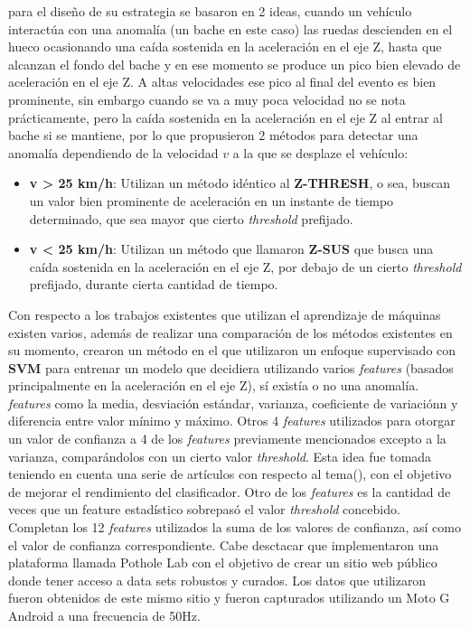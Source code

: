 \cite{mohan2008nericell} para el diseño de su estrategia se basaron en 2 ideas, cuando un vehículo interactúa con una
anomalía (un bache en este caso) las ruedas descienden en el hueco ocasionando una caída sostenida en la aceleración en el eje Z,
hasta que alcanzan el fondo del bache y en ese momento se produce un pico bien elevado de aceleración en el eje Z. A altas velocidades
ese pico al final del evento es bien prominente, sin embargo cuando se va a muy poca velocidad no se nota prácticamente, pero la caída
sostenida en la aceleración en el eje Z al entrar al bache si se mantiene, por lo que propusieron 2 métodos para detectar una anomalía
dependiendo de la velocidad $v$ a la que se desplaze el vehículo:\\

\begin{itemize}
	\item \textbf {v > 25 km/h}:  Utilizan un método idéntico al \textbf {Z-THRESH}, o sea, buscan un valor bien prominente de
	      aceleración en un instante de tiempo determinado, que sea mayor que cierto \emph{threshold} prefijado.\\
	\item \textbf {v < 25 km/h}:  Utilizan un método que llamaron \textbf {Z-SUS} que busca una caída sostenida en la aceleración
	      en el eje Z, por debajo de un cierto \emph{threshold} prefijado, durante cierta cantidad de tiempo.\\
\end{itemize}

Con respecto a los trabajos existentes que utilizan el aprendizaje de máquinas existen varios, \cite{carlos2018evaluation} además de realizar
una comparación de los métodos existentes en su momento, crearon un método en el que utilizaron un enfoque supervisado con \textbf{SVM} para entrenar
un modelo que decidiera utilizando varios \emph{features} (basados principalmente en la aceleración en el eje Z), sí existía o no una anomalía. \emph{features}
como la media, desviación estándar, varianza, coeficiente de variaciónn y diferencia entre valor mínimo y máximo. Otros 4 \emph{features} utilizados para
otorgar un valor de confianza a 4 de los \emph{features} previamente mencionados excepto a la varianza, comparándolos con un cierto valor \emph{threshold}.
Esta idea fue tomada teniendo en cuenta una serie de artículos con respecto al tema(\cite{mednis2011real}), con el objetivo de mejorar el rendimiento
del clasificador. Otro de los \emph{features} es la cantidad de veces que un feature estadístico sobrepasó el valor \emph{threshold} concebido. Completan los
12 \emph{features} utilizados la suma de los valores de confianza, así como el valor de confianza correspondiente. Cabe desctacar que implementaron una
plataforma llamada Pothole Lab con el objetivo de crear un sitio web público donde tener acceso a data sets robustos y curados. Los datos que utilizaron fueron
obtenidos de este mismo sitio y fueron capturados utilizando un Moto G Android a una frecuencia de 50Hz.\\

